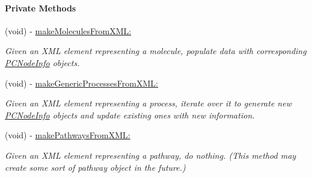 \begin{Indent}\paragraph*{Private Methods}
\begin{DoxyCompactItemize}
\item 
\hypertarget{interface_p_c_graph_data_fetcher_ab9c266c65739de014829fe2c5f6a2032}{
(void) -\/ \hyperlink{interface_p_c_graph_data_fetcher_ab9c266c65739de014829fe2c5f6a2032}{makeMoleculesFromXML:}}
\label{interface_p_c_graph_data_fetcher_ab9c266c65739de014829fe2c5f6a2032}

\begin{DoxyCompactList}\small\item\em Given an XML element representing a molecule, populate data with corresponding \hyperlink{interface_p_c_node_info}{PCNodeInfo} objects. \end{DoxyCompactList}\item 
\hypertarget{interface_p_c_graph_data_fetcher_a8fd355b35b31eb3032c4478600689baa}{
(void) -\/ \hyperlink{interface_p_c_graph_data_fetcher_a8fd355b35b31eb3032c4478600689baa}{makeGenericProcessesFromXML:}}
\label{interface_p_c_graph_data_fetcher_a8fd355b35b31eb3032c4478600689baa}

\begin{DoxyCompactList}\small\item\em Given an XML element representing a process, iterate over it to generate new \hyperlink{interface_p_c_node_info}{PCNodeInfo} objects and update existing ones with new information. \end{DoxyCompactList}\item 
\hypertarget{interface_p_c_graph_data_fetcher_a810d0475df30f88ceeee4fc762a6ff5c}{
(void) -\/ \hyperlink{interface_p_c_graph_data_fetcher_a810d0475df30f88ceeee4fc762a6ff5c}{makePathwaysFromXML:}}
\label{interface_p_c_graph_data_fetcher_a810d0475df30f88ceeee4fc762a6ff5c}

\begin{DoxyCompactList}\small\item\em Given an XML element representing a pathway, do nothing. (This method may create some sort of pathway object in the future.) \end{DoxyCompactList}\end{DoxyCompactItemize}
\end{Indent}
